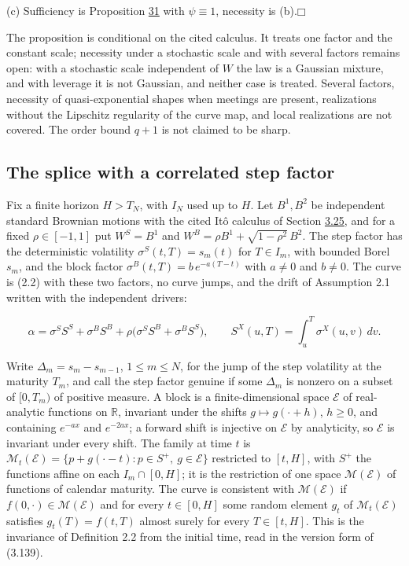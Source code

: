 \documentclass[11pt]{article}
\providecommand{\square}{\mdlgwhtsquare}
\begin{document}
(c) Sufficiency is Proposition \hyperref[res:Proposition-31]{31} with \(\psi\equiv1\), necessity is (b).\hfill$\square$

The proposition is conditional on the cited calculus. It treats one factor and the constant scale; necessity under a stochastic scale and with several factors remains open: with a stochastic scale independent of \(W\) the law is a Gaussian mixture, and with leverage it is not Gaussian, and neither case is treated. Several factors, necessity of quasi-exponential shapes when meetings are present, realizations without the Lipschitz regularity of the curve map, and local realizations are not covered. The order bound \(q+1\) is not claimed to be sharp.

\subsection{The splice with a correlated step factor}\label{sec:3.30}

Fix a finite horizon \(H>T_N\), with \(I_N\) used up to \(H\). Let \(B^1,B^2\) be independent standard Brownian motions with the cited Itô calculus of Section \hyperref[sec:3.25]{3.25}, and for a fixed \(\rho\in[-1,1]\) put \(W^S=B^1\) and \(W^B=\rho B^1+\sqrt{1-\rho^2}\,B^2\). The step factor has the deterministic volatility \(\sigma^S(t,T)=s_m(t)\) for \(T\in I_m\), with bounded Borel \(s_m\), and the block factor \(\sigma^B(t,T)=b\,e^{-a(T-t)}\) with \(a\neq0\) and \(b\neq0\). The curve is (2.2) with these two factors, no curve jumps, and the drift of Assumption 2.1 written with the independent drivers:

\begin{equation*}
\alpha=\sigma^SS^S+\sigma^BS^B+\rho\bigl(\sigma^SS^B+\sigma^BS^S\bigr),\qquad S^X(u,T)=\int_u^T\sigma^X(u,v)\,dv. \tag{3.153}\label{eq:3.153}
\end{equation*}

Write \(\Delta_m=s_m-s_{m-1}\), \(1\le m\le N\), for the jump of the step volatility at the maturity \(T_m\), and call the step factor genuine if some \(\Delta_m\) is nonzero on a subset of \([0,T_m)\) of positive measure. A block is a finite-dimensional space \(\mathcal E\) of real-analytic functions on \(\mathbb R\), invariant under the shifts \(g\mapsto g(\cdot+h)\), \(h\ge0\), and containing \(e^{-ax}\) and \(e^{-2ax}\); a forward shift is injective on \(\mathcal E\) by analyticity, so \(\mathcal E\) is invariant under every shift. The family at time \(t\) is \(\mathcal M_t(\mathcal E)=\{p+g(\cdot-t):p\in S^+,\ g\in\mathcal E\}\) restricted to \([t,H]\), with \(S^+\) the functions affine on each \(I_m\cap[0,H]\); it is the restriction of one space \(\mathcal M(\mathcal E)\) of functions of calendar maturity. The curve is consistent with \(\mathcal M(\mathcal E)\) if \(f(0,\cdot)\in\mathcal M(\mathcal E)\) and for every \(t\in[0,H]\) some random element \(g_t\) of \(\mathcal M_t(\mathcal E)\) satisfies \(g_t(T)=f(t,T)\) almost surely for every \(T\in[t,H]\). This is the invariance of \cite{bjork1999interest} Definition 2.2 from the initial time, read in the version form of (3.139).
\end{document}

